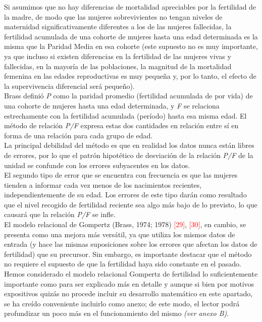 Si asumimos que no hay diferencias de mortalidad apreciables por la fertilidad de la madre, de modo que las mujeres sobrevivientes no tengan niveles de maternidad significativamente diferentes a los de las mujeres fallecidas, la fertilidad acumulada de una cohorte de mujeres hasta una edad determinada es la misma que la Paridad Media en esa cohorte (este supuesto no es muy importante, ya que incluso si existen diferencias en la fertilidad de las mujeres vivas y fallecidas, en la mayoría de las poblaciones, la magnitud de la mortalidad femenina en las edades reproductivas es muy pequeña y, por lo tanto, el efecto de la supervivencia diferencial será pequeño).\\
Brass definió \textit{P} como la paridad promedio (fertilidad acumulada de por vida) de una cohorte de mujeres hasta una edad determinada, y \textit{F} se relaciona estrechamente con la fertilidad acumulada (período) hasta esa misma edad. El método de relación \textit{P/F} expresa estas dos cantidades en relación entre sí en forma de una relación para cada grupo de edad.\\

La principal debilidad del método es que en realidad los datos nunca están libres de errores, por lo que el patrón hipotético de desviación de la relación \textit{P/F} de la unidad se confunde con los errores subyacentes en los datos.\\
El segundo tipo de error que se encuentra con frecuencia es que las mujeres tienden a informar cada vez menos de los nacimientos recientes, independientemente de su edad. Los errores de este tipo darán como resultado que el nivel recogido de fertilidad reciente sea algo más bajo de lo previsto, lo que causará que la relación \textit{P/F} se infle.\\

El modelo relacional de Gompertz (Brass, 1974; 1978) \textcolor{red}{[29]}, \textcolor{red}{[30]}, en cambio, se presenta como una mejora m\'as vers\'atil, ya que utiliza los mismos datos de entrada (y hace las mismas suposiciones sobre los errores que afectan los datos de fertilidad) que su precursor. Sin embargo, es importante destacar que el método no requiere el supuesto de que la fertilidad haya sido constante en el pasado. Hemos considerado el modelo relacional Gompertz de fertilidad lo suficientemente importante como para ser explicado más en detalle y aunque si bien por motivos expositivos quizás no procede incluir su desarrollo matemático en este apartado, se ha creído conveniente incluirlo como anexo; de este modo, el lector podrá profundizar un poco más en el funcionamiento del mismo \textit{(ver anexo B)}.\\

